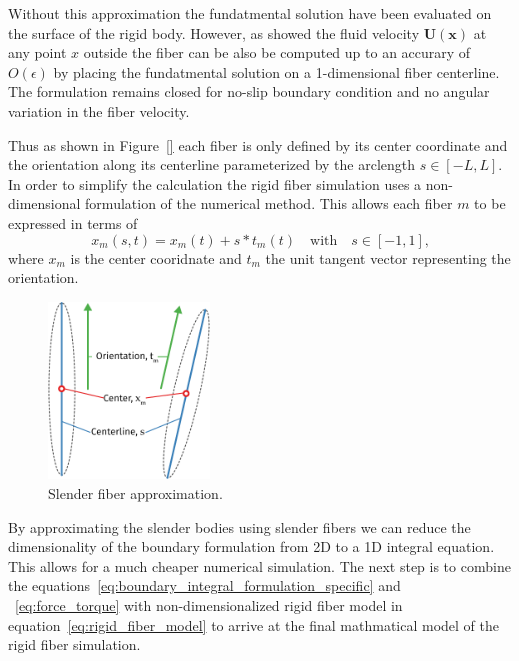\documentclass[a4paper,11pt]{kth-mag}
\begin{document}
Without this approximation the fundatmental solution have been evaluated on the surface of the rigid body. However, as \cite{} showed the fluid velocity $\mathbf{U}(\mathbf{x})$ at any point $x$ outside the fiber can be also be computed up to an accurary of $O(\epsilon)$ by placing the fundatmental solution on a 1-dimensional fiber centerline. The formulation remains closed for no-slip boundary condition and no angular variation in the fiber velocity.

Thus as shown in Figure~\ref{} each fiber is only defined by its center coordinate and the orientation along its centerline parameterized by the arclength $s \in [-L, L]$. In order to simplify the calculation the rigid fiber simulation uses a non-dimensional formulation of the numerical method. This allows each fiber $m$ to be expressed in terms of
\begin{equation}
  \label{eq:rigid_fiber_model}
  x_m(s,t) = x_m(t) + s * t_m(t) \quad \text{with} \quad s \in [-1, 1] \text{,}
\end{equation}
where $x_m$ is the center cooridnate and $t_m$ the unit tangent vector representing the orientation.

\begin{figure}[!htbp]
  \centering
  \includegraphics[width=0.3819660112501450000000\textwidth]{img/slender.pdf}
  \caption{Slender fiber approximation.}
  \label{fig:slender_fiber}
\end{figure}

By approximating the slender bodies using slender fibers we can reduce the dimensionality of the boundary formulation from 2D to a 1D integral equation. This allows for a much cheaper numerical simulation. The next step is to combine the equations~\eqref{eq:boundary_integral_formulation_specific} and ~\eqref{eq:force_torque} with non-dimensionalized rigid fiber model in equation~\eqref{eq:rigid_fiber_model} to arrive at the final mathmatical model of the rigid fiber simulation.
\end{document}
